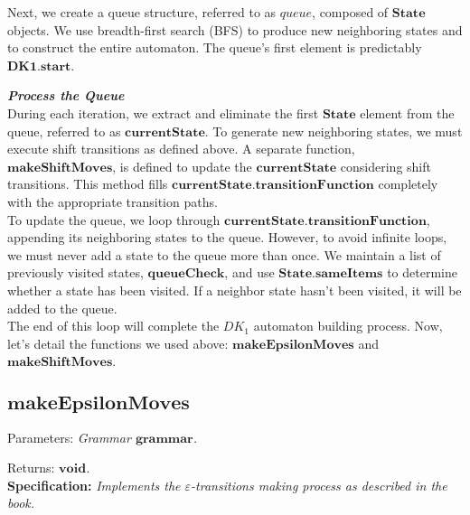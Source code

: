 Next, we create a queue structure, referred to as \(queue\), composed of \(\boldsymbol{State}\) objects. We use breadth-first search (BFS) to produce new neighboring states and to construct the entire automaton. The queue's first element is predictably \(\boldsymbol{DK1.start}\).\\

\vspace{15pt}

\textbf{\textit{Process the Queue}}\\

During each iteration, we extract and eliminate the first \(\boldsymbol{State}\) element from the queue, referred to as \(\boldsymbol{currentState}\). To generate new neighboring states, we must execute shift transitions as defined above. A separate function, \(\boldsymbol{makeShiftMoves}\), is defined to update the \(\boldsymbol{currentState}\) considering shift transitions. This method fills \(\boldsymbol{currentState.transitionFunction}\) completely with the appropriate transition paths.\\

To update the queue, we loop through \(\boldsymbol{currentState.transitionFunction}\), appending its neighboring states to the queue. However, to avoid infinite loops, we must never add a state to the queue more than once. We maintain a list of previously visited states, \(\boldsymbol{queueCheck}\), and use \(\boldsymbol{State.sameItems}\) to determine whether a state has been visited. If a neighbor state hasn't been visited, it will be added to the queue.\\

The end of this loop will complete the \(DK_{1}\) automaton building process. Now, let's detail the functions we used above: \(\boldsymbol{makeEpsilonMoves}\) and \(\boldsymbol{makeShiftMoves}\).

\vspace{30pt}

\subsection*{\(\boldsymbol{makeEpsilonMoves}\)}

Parameters: \textit{Grammar \(\boldsymbol{grammar}\).}

Returns: \textit{\(\boldsymbol{void}\).}\\

\textbf{Specification:} \textit{Implements the \(\varepsilon\)-transitions making process as described in the book.}\\

